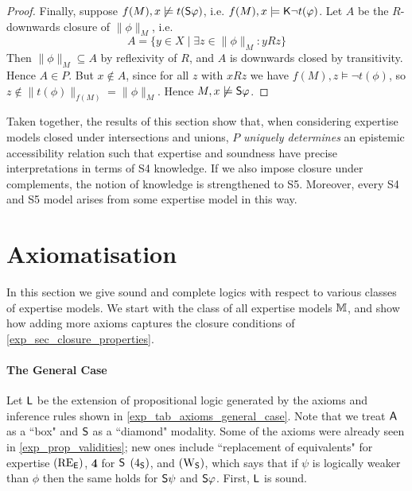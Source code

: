 \begin{proof}
              Finally, suppose $f(M), x \not\models t(\S\phi)$, i.e.  $f(M), x
              \models \K\neg t(\phi)$. Let $A$ be the $R$-downwards closure of
              $\|\phi\|_M$, i.e.
              \[
                  A = \{y \in X \mid \exists z \in \|\phi\|_M: yRz\}
              \]
              Then $\|\phi\|_M \subseteq A$ by reflexivity of $R$, and $A$ is
              downwards closed by transitivity.  Hence $A \in P$.  But $x
              \notin A$, since for all $z$ with $xRz$ we have $f(M), z \models
              \neg t(\phi)$, so $z \notin \|t(\phi)\|_{f(M)} = \|\phi\|_M$.
              Hence $M, x \not\models \S\phi$.
\end{proof}

Taken together, the results of this section show that, when considering
expertise models closed under intersections and unions, $P$ \emph{uniquely determines}
an epistemic accessibility relation such that expertise and soundness have
precise interpretations in terms of S4 knowledge. If we also impose closure
under complements, the notion of knowledge is strengthened to S5. Moreover,
every S4 and S5 model arises from some expertise model in this way.

\section{Axiomatisation}
\label{exp_sec_axiomatisation}

In this section we give sound and complete logics with respect to various
classes of expertise models. We start with the class of all expertise
models $\M$, and show how adding more axioms captures the closure conditions of
\cref{exp_sec_closure_properties}.

\paragraph{The General Case}

Let $\sL$ be the extension of propositional logic generated by the axioms and
inference rules shown in \cref{exp_tab_axioms_general_case}. Note that we treat
$\A$ as a ``box" and $\S$ as a ``diamond" modality. Some of the axioms were
already seen in \cref{exp_prop_validities}; new ones include ``replacement of
equivalents" for expertise $\reE$, \textbf{4} for $\S$ $\foursoundness$,
and $\weakeningS$, which says that if $\psi$ is logically weaker than $\phi$
then the same holds for $\S\psi$ and $\S\phi$. First, $\sL$ is sound.

